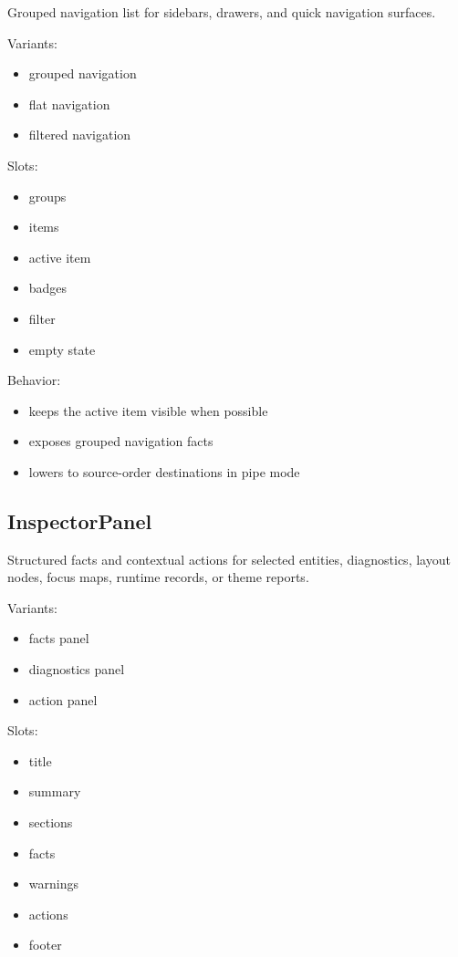 Grouped navigation list for sidebars, drawers, and quick navigation surfaces.

Variants:

\begin{itemize}
\tightlist
\item
  grouped navigation
\item
  flat navigation
\item
  filtered navigation
\end{itemize}

Slots:

\begin{itemize}
\tightlist
\item
  groups
\item
  items
\item
  active item
\item
  badges
\item
  filter
\item
  empty state
\end{itemize}

Behavior:

\begin{itemize}
\tightlist
\item
  keeps the active item visible when possible
\item
  exposes grouped navigation facts
\item
  lowers to source-order destinations in pipe mode
\end{itemize}

\subsection{InspectorPanel}\label{record-128-inspectorpanel}

Structured facts and contextual actions for selected entities, diagnostics, layout nodes, focus maps, runtime records, or theme reports.

Variants:

\begin{itemize}
\tightlist
\item
  facts panel
\item
  diagnostics panel
\item
  action panel
\end{itemize}

Slots:

\begin{itemize}
\tightlist
\item
  title
\item
  summary
\item
  sections
\item
  facts
\item
  warnings
\item
  actions
\item
  footer
\end{itemize}

